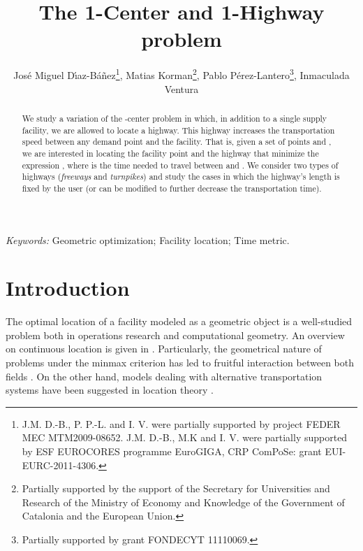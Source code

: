 \documentclass{llncs}
\begin{document}
\title{The 1-Center and 1-Highway problem}



\author{Jos\'{e} Miguel D\'{\i}az-B\'{a}\~{n}ez\fnmsep\thanks{J.M. D.-B., P. P.-L. and I. V. were partially supported by project FEDER MEC MTM2009-08652. J.M. D.-B., M.K and I. V. were partially supported by ESF EUROCORES programme EuroGIGA, CRP ComPoSe: grant EUI-EURC-2011-4306.},
Matias Korman\fnmsep\thanks{Partially supported by the support of the Secretary for Universities and Research of the Ministry of Economy and Knowledge of the Government of Catalonia and the European Union.},
Pablo P\'erez-Lantero\thanks{Partially supported by grant FONDECYT 11110069.},
Inmaculada Ventura\fnmsep}









\maketitle

\begin{abstract}
We study a variation of the -center problem in which, in addition to a single supply facility, we are allowed to locate a highway. This highway increases the transportation speed between any demand point and the facility. That is, given a set  of points and , we are interested in locating the facility point  and the highway  that minimize the expression , where  is the time needed to travel between  and . We consider two types of highways ({\em freeways} and {\em turnpikes}) and study the cases in which the highway's length is fixed by the user (or can be modified to further decrease the transportation time).
\end{abstract}

\textit{Keywords:} Geometric optimization; Facility location; Time metric.

\section{Introduction}
The optimal location of a facility modeled as a geometric object is a well-studied problem both in operations research and computational geometry. An overview on continuous location is given in \cite{plastria}. Particularly, the geometrical nature of problems under the minmax criterion has led to fruitful interaction between both fields \cite{hamacher,godfried}. On the other hand, models dealing with alternative transportation systems have been suggested in location theory \cite{mesa}.
\end{document}
